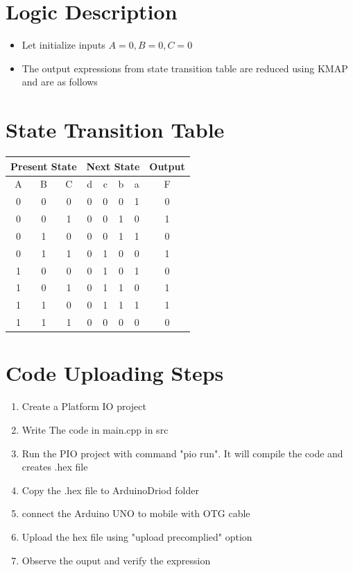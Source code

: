 \documentclass[a4paper,12pt]{article}
\begin{document}
\section*{Logic Description}
\begin{itemize}
	\item Let initialize inputs $A=0,B=0,C=0$
	\item The output expressions from state transition table are reduced using KMAP and are as follows
\end{itemize}
\section*{State Transition Table}
\begin{center}
\begin{tabular}{|c|c|c|c|c|c|c|c|}
\hline
	\multicolumn{3}{|c|}{\textbf{Present State}} & \multicolumn{4}{|c|}{\textbf{Next State}} & \textbf{Output} \\ \hline
	A & B & C & d & c & b & a & F\\ \hline
	0 & 0 & 0 & 0 & 0 & 0 & 1 & 0\\
	0 & 0 & 1 & 0 & 0 & 1 & 0 & 1\\
	0 & 1 & 0 & 0 & 0 & 1 & 1 & 0\\
	0 & 1 & 1 & 0 & 1 & 0 & 0 & 1\\
	1 & 0 & 0 & 0 & 1 & 0 & 1 & 0\\
	1 & 0 & 1 & 0 & 1 & 1 & 0 & 1\\
	1 & 1 & 0 & 0 & 1 & 1 & 1 & 1\\
	1 & 1 & 1 & 0 & 0 & 0 & 0 & 0\\ \hline
\end{tabular}
\end{center}
\section*{Code Uploading Steps}
\begin{enumerate}
	\item Create a Platform IO project
	\item Write The code in main.cpp in src
	\item Run the PIO project with command "pio run". It will compile the code and creates .hex file
	\item Copy the .hex file to ArduinoDriod folder
	\item connect the Arduino UNO to mobile with OTG cable
	\item Upload the hex file using "upload precomplied" option
	\item Observe the ouput and verify the expression
\end{enumerate}
\end{document}

